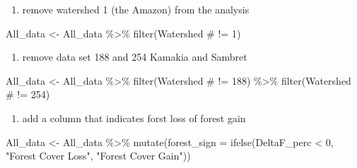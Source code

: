 \documentclass[]{elsarticle} %
\newenvironment{Shaded}{\begin{snugshade}}{\end{snugshade}}
\newcommand{\AttributeTok}[1]{\textcolor[rgb]{0.77,0.63,0.00}{#1}}
\newcommand{\DecValTok}[1]{\textcolor[rgb]{0.00,0.00,0.81}{#1}}
\newcommand{\FunctionTok}[1]{\textcolor[rgb]{0.00,0.00,0.00}{#1}}
\newcommand{\NormalTok}[1]{#1}
\newcommand{\OtherTok}[1]{\textcolor[rgb]{0.56,0.35,0.01}{#1}}
\newcommand{\SpecialCharTok}[1]{\textcolor[rgb]{0.00,0.00,0.00}{#1}}
\newcommand{\StringTok}[1]{\textcolor[rgb]{0.31,0.60,0.02}{#1}}
\providecommand{\tightlist}{%
  \setlength{\itemsep}{0pt}\setlength{\parskip}{0pt}}
\begin{document}
\begin{enumerate}
\def\labelenumi{\arabic{enumi}.}
\setcounter{enumi}{2}
\tightlist
\item
  remove watershed 1 (the Amazon) from the analysis
\end{enumerate}

\begin{Shaded}
\begin{Highlighting}[]
\NormalTok{All\_data }\OtherTok{\textless{}{-}}\NormalTok{ All\_data }\SpecialCharTok{\%\textgreater{}\%}
  \FunctionTok{filter}\NormalTok{(}\StringTok{\textasciigrave{}}\AttributeTok{Watershed \#}\StringTok{\textasciigrave{}} \SpecialCharTok{!=} \DecValTok{1}\NormalTok{)}
\end{Highlighting}
\end{Shaded}

\begin{enumerate}
\def\labelenumi{\arabic{enumi}.}
\setcounter{enumi}{3}
\tightlist
\item
  remove data set 188 and 254 Kamakia and Sambret
\end{enumerate}

\begin{Shaded}
\begin{Highlighting}[]
\NormalTok{All\_data }\OtherTok{\textless{}{-}}\NormalTok{ All\_data }\SpecialCharTok{\%\textgreater{}\%}
  \FunctionTok{filter}\NormalTok{(}\StringTok{\textasciigrave{}}\AttributeTok{Watershed \#}\StringTok{\textasciigrave{}} \SpecialCharTok{!=} \DecValTok{188}\NormalTok{) }\SpecialCharTok{\%\textgreater{}\%}
  \FunctionTok{filter}\NormalTok{(}\StringTok{\textasciigrave{}}\AttributeTok{Watershed \#}\StringTok{\textasciigrave{}} \SpecialCharTok{!=} \DecValTok{254}\NormalTok{)}
\end{Highlighting}
\end{Shaded}

\begin{enumerate}
\def\labelenumi{\arabic{enumi}.}
\setcounter{enumi}{4}
\tightlist
\item
  add a column that indicates forst loss of forest gain
\end{enumerate}

\begin{Shaded}
\begin{Highlighting}[]
\NormalTok{All\_data }\OtherTok{\textless{}{-}}\NormalTok{ All\_data }\SpecialCharTok{\%\textgreater{}\%}
  \FunctionTok{mutate}\NormalTok{(}\AttributeTok{forest\_sign =} \FunctionTok{ifelse}\NormalTok{(DeltaF\_perc }\SpecialCharTok{\textless{}} \DecValTok{0}\NormalTok{, }\StringTok{"Forest Cover Loss"}\NormalTok{,}
                              \StringTok{"Forest Cover Gain"}\NormalTok{))}
\end{Highlighting}
\end{Shaded}
\end{document}
